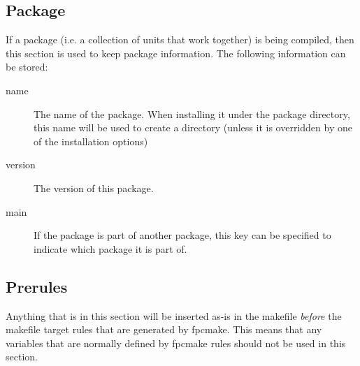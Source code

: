 {\subsection{Package}
If a package (i.e. a collection of units that work together) is being 
compiled, then this section is used to keep package information. 
The following information can be stored:
\begin{description}
\item[name] The name of the package. When installing it under the package
directory, this name will be used to create a directory (unless it is
overridden by one of the installation options)
\item[version] The version of this package.
\item[main] If the package is part of another package, this key can be
specified to indicate which package it is part of.
\end{description}

\subsection{Prerules}
Anything that is in this section will be inserted as-is in the makefile
\textit{before} the makefile target rules that are generated by fpcmake.
This means that any variables that are normally defined by fpcmake rules
should not be used in this section.

}
